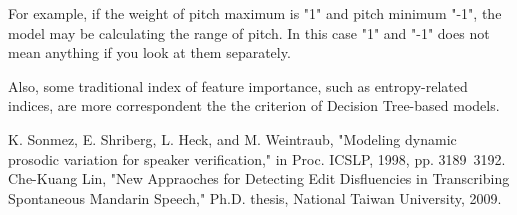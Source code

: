 \documentclass[12pt]{article}
\begin{document}
For example, if the weight of pitch maximum is "1" and pitch minimum "-1", the model may be calculating the range of pitch. In this case "1" and "-1" does not mean anything if you look at them separately.

Also, some traditional index of feature importance, such as entropy-related indices, are more correspondent the the criterion of Decision Tree-based models.

\begin{thebibliography}{99}
 K. Sonmez, E. Shriberg, L. Heck, and M. Weintraub, "Modeling dynamic prosodic variation for speaker verification," in Proc. ICSLP, 1998, pp. 3189~3192.
 Che-Kuang Lin, "New Appraoches for Detecting Edit Disfluencies in Transcribing Spontaneous Mandarin Speech," Ph.D. thesis, National Taiwan University, 2009.
\end{thebibliography}
\end{document}
